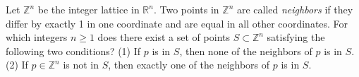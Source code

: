 Let $\mathbb{Z}^n$ be the integer lattice in $\mathbb{R}^n$. Two points in $\mathbb{Z}^n$ are called {\em neighbors} if they differ by exactly 1 in one coordinate and are equal in all other coordinates. For which integers $n \geq 1$ does there exist a set of points $S \subset \mathbb{Z}^n$ satisfying the following two conditions?
(1) If $p$ is in $S$, then none of the neighbors of $p$ is in $S$.
(2) If $p \in \mathbb{Z}^n$ is not in $S$, then exactly one of the neighbors of $p$ is in $S$.